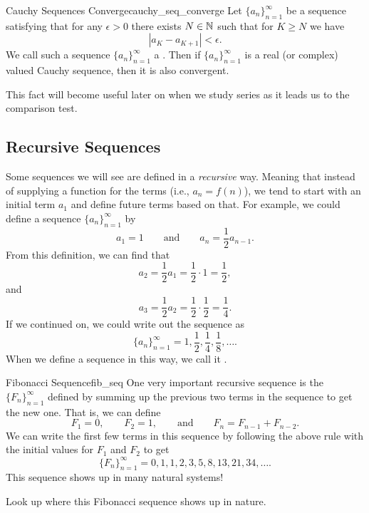 \begin{thm}{Cauchy Sequences Converge}{cauchy_seq_converge}
Let $\{a_n\}_{n=1}^\infty$ be a sequence satisfying that for any $\epsilon >0$ there exists $N\in \mathbb{N}$ such that for $K\geq N$ we have
\[
|a_{K}-a_{K+1}|<\epsilon.
\]
We call such a sequence $\{a_n\}_{n=1}^\infty$ a .  Then if $\{a_n\}_{n=1}^\infty$ is a real (or complex) valued Cauchy sequence, then it is also convergent.
\end{thm}

\noindent This fact will become useful later on when we study series as it leads us to the comparison test.

\subsection{Recursive Sequences}

Some sequences we will see are defined in a \emph{recursive} way.  Meaning that instead of supplying a function for the terms (i.e., $a_n = f(n)$), we tend to start with an initial term $a_1$ and define future terms based on that.  For example, we could define a sequence $\{a_n\}_{n=1}^\infty$ by
\[ 
a_1 = 1 \qquad \textrm{and} \qquad a_n = \frac{1}{2} a_{n-1}.
\]
From this definition, we can find that
\[
a_2 = \frac{1}{2} a_1 = \frac{1}{2} \cdot 1 = \frac{1}{2},
\]
and
\[
a_3 = \frac{1}{2} a_2 = \frac{1}{2} \cdot \frac{1}{2} = \frac{1}{4}.
\]
If we continued on, we could write out the sequence as
\[
\{a_n\}_{n=1}^\infty = 1, \frac{1}{2},\frac{1}{4}, \frac{1}{8}, \dots.
\]
When we define a sequence in this way, we call it .

\begin{ex}{Fibonacci Sequence}{fib_seq}
One very important recursive sequence is the  $\{F_n\}_{n=1}^\infty$ defined by summing up the previous two terms in the sequence to get the new one.  That is, we can define
\[
F_1 = 0, \qquad F_2=1, \qquad \textrm{and} \qquad F_n = F_{n-1} + F_{n-2}.
\]
We can write the first few terms in this sequence by following the above rule with the initial values for $F_1$ and $F_2$ to get
\[
\{F_n\}_{n=1}^\infty = 0,1,1,2,3,5,8,13,21,34,\dots.
\]
This sequence shows up in many natural systems! 
\end{ex}

\begin{exercise}
Look up where this Fibonacci sequence shows up in nature.
\end{exercise}

